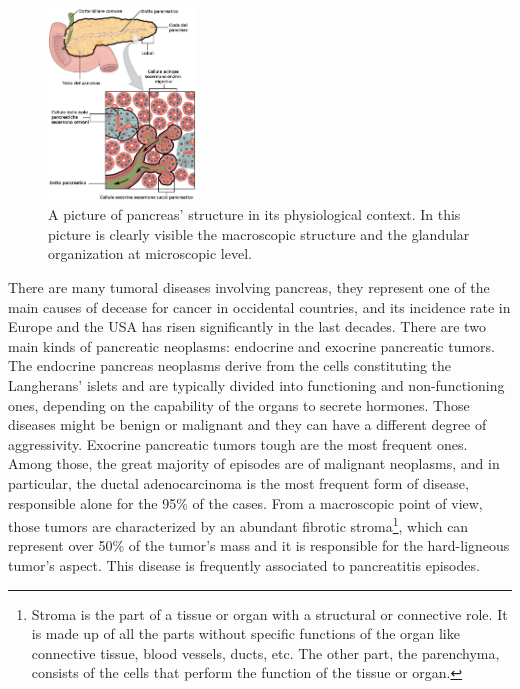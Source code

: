      \begin{figure}
         \centering
         \includegraphics[width = 0.35\textwidth]{images/pancr_struct_zoom}
         \caption{A picture of pancreas' structure in its physiological context. In this picture is clearly visible the macroscopic structure and the glandular organization at microscopic level.}
         \label{fig:panc_struct}
     \end{figure}

    There are many tumoral diseases involving pancreas, they represent one of the main causes of decease for cancer in occidental countries, and its incidence rate in Europe and the USA has risen significantly in the last decades. There are two main kinds of pancreatic neoplasms: endocrine and exocrine pancreatic tumors. The endocrine pancreas neoplasms derive from the cells constituting the Langherans' islets and are typically divided into functioning and non-functioning ones, depending on the capability of the organs to secrete hormones. Those diseases might be benign or malignant and they can have a different degree of aggressivity. Exocrine pancreatic tumors tough are the most frequent ones. Among those, the great majority of episodes are of malignant neoplasms, and in particular, the ductal adenocarcinoma is the most frequent form of disease, responsible alone for the 95\% of the cases. From a macroscopic point of view, those tumors are characterized by an abundant fibrotic stroma\footnote{Stroma is the part of a tissue or organ with a structural or connective role. It is made up of all the parts without specific functions of the organ like connective tissue, blood vessels, ducts, etc. The other part, the parenchyma, consists of the cells that perform the function of the tissue or organ.}, which can represent over 50\% of the tumor's mass and it is responsible for the hard-ligneous tumor's aspect. This disease is frequently associated to pancreatitis episodes.

